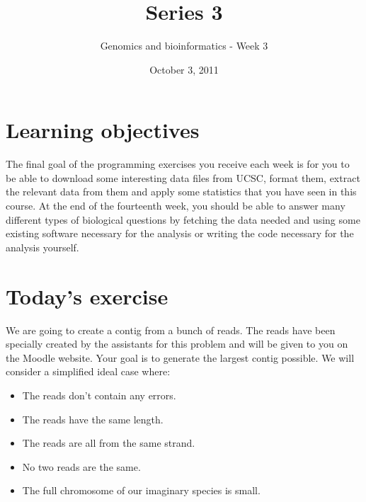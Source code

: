 \documentclass[a4paper,11pt]{article}
\title{Series 3}
\date{October 3, 2011}
\author{Genomics and bioinformatics - Week 3}
\begin{document}
\maketitle

\section{Learning objectives}
The final goal of the programming exercises you receive each week is for you to be able to download some interesting data files from UCSC, format them, extract the relevant data from them and apply some statistics that you have seen in this course. At the end of the fourteenth week, you should be able to answer many different types of biological questions by fetching the data needed and using some existing software necessary for the analysis or writing the code necessary for the analysis yourself.

\section{Today's exercise}
We are going to create a contig from a bunch of reads. The reads have been specially created by the assistants for this problem and will be given to you on the Moodle website. Your goal is to generate the largest contig possible. We will consider a simplified ideal case where:
\begin{itemize}
\item The reads don't contain any errors.
\item The reads have the same length.
\item The reads are all from the same strand.
\item No two reads are the same.
\item The full chromosome of our imaginary species is small.
\end{itemize}
\end{document}

